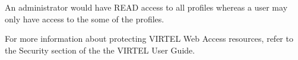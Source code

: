 \documentclass[letterpaper,10pt,english]{sphinxmanual}
\begin{document}
\begin{sphinxVerbatim}[commandchars=\\\{\}]
       
    
\end{sphinxVerbatim}

An administrator would have READ access to all profiles whereas a user may only have access to the some of the profiles.

For more information about protecting VIRTEL Web Access resources, refer to the Security section of the the VIRTEL User Guide.
\end{document}
